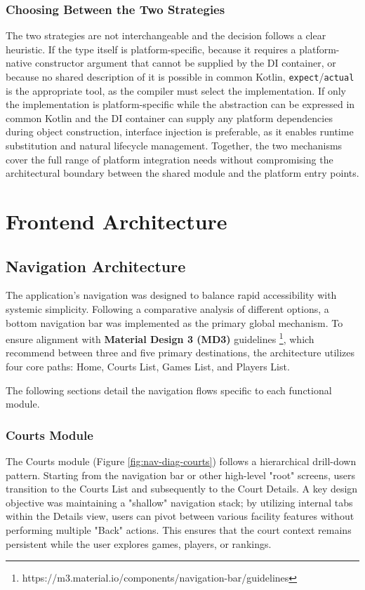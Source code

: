 \subsubsection{Choosing Between the Two Strategies}

The two strategies are not interchangeable and the decision follows a clear heuristic. 
If the type itself is platform-specific, because it requires a platform-native constructor argument that cannot be supplied by the DI container, or because no shared description of it is possible in common Kotlin, \texttt{expect}/\texttt{actual} is the appropriate tool, as the compiler must select the implementation. 
If only the implementation is platform-specific while the abstraction can be expressed in common Kotlin and the DI container can supply any platform dependencies during object construction, interface injection is preferable, as it enables runtime substitution and natural lifecycle management.
Together, the two mechanisms cover the full range of platform integration needs without compromising the architectural boundary between the shared module and the platform entry points.

\section{Frontend Architecture}
\label{sec:arch-frontend}


\subsection{Navigation Architecture}
\label{subsec:nav-architecture}

The application's navigation was designed to balance rapid accessibility with systemic simplicity. Following a comparative analysis of different options, a bottom navigation bar was implemented as the primary global mechanism. To ensure alignment with \textbf{Material Design 3 (MD3)} guidelines \footnote{https://m3.material.io/components/navigation-bar/guidelines}, which recommend between three and five primary destinations, the architecture utilizes four core paths: Home, Courts List, Games List, and Players List.

The following sections detail the navigation flows specific to each functional module.

\subsubsection{Courts Module}
The Courts module (Figure \ref{fig:nav-diag-courts}) follows a hierarchical drill-down pattern. Starting from the navigation bar or other high-level "root" screens, users transition to the Courts List and subsequently to the Court Details. A key design objective was maintaining a "shallow" navigation stack; by utilizing internal tabs within the Details view, users can pivot between various facility features without performing multiple "Back" actions. This ensures that the court context remains persistent while the user explores games, players, or rankings.


